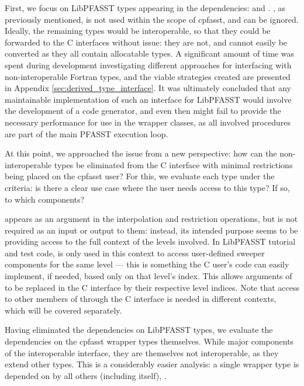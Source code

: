First, we focus on LibPFASST types appearing in the dependencies:  and . , as previously mentioned, is not used within the scope of cpfasst, and can be ignored. Ideally, the remaining types would be interoperable, so that they could be forwarded to the C interfaces without issue: they are not, and cannot easily be converted as they all contain allocatable types. A significant amount of time was spent during development investigating different approaches for interfacing with non-interoperable Fortran types, and the viable strategies created are presented in Appendix \ref{sec:derived_type_interface}. It was ultimately concluded that any maintainable implementation of such an interface for LibPFASST would involve the development of a code generator, and even then might fail to provide the necessary performance for use in the wrapper classes, as all involved procedures are part of the main PFASST execution loop. 

At this point, we approached the issue from a new perspective: how can the non-interoperable types be eliminated from the C interface with minimal restrictions being placed on the cpfasst user? For this, we evaluate each type under the criteria: is there a clear use case where the user needs access to this type? If so, to which components?

 appears as an argument in the interpolation and restriction operations, but is not required as an input or output to them: instead, its intended purpose seems to be providing access to the full context of the levels involved. In LibPFASST tutorial and test code,  is only used in this context to access user-defined sweeper components for the same level --- this is something the C user's code can easily implement, if needed, based only on that level's index. This allows arguments of  to be replaced in the C interface by their respective level indices. Note that access to other members of  through the C interface is needed in different contexts, which will be covered separately. 

Having eliminated the dependencies on LibPFASST types, we evaluate the dependencies on the cpfasst wrapper types themselves. While major components of the interoperable interface, they are themselves not interoperable, as they extend other types. This is a considerably easier analysis: a single wrapper type is depended on by all others (including itself), . 

